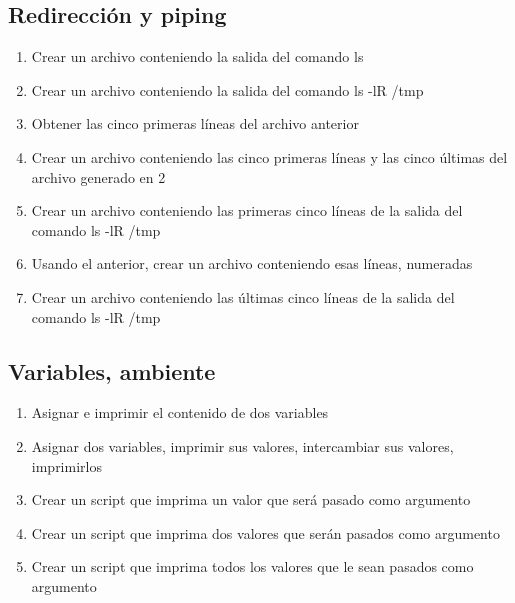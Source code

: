 \subsection{Redirección y piping}
\begin{enumerate}
	\item Crear un archivo conteniendo la salida del comando ls
	\item Crear un archivo conteniendo la salida del comando ls -lR /tmp
	\item Obtener las cinco primeras líneas del archivo anterior
	\item Crear un archivo conteniendo las cinco primeras líneas y las cinco  últimas del archivo generado en 2
	\item Crear un archivo conteniendo las primeras cinco líneas de la salida del comando ls -lR /tmp
	\item Usando el anterior, crear un archivo conteniendo esas líneas, numeradas
	\item Crear un archivo conteniendo las últimas cinco líneas de la salida del comando ls -lR /tmp
\end{enumerate}


\subsection {Variables, ambiente}
\begin{enumerate}
	\item Asignar e imprimir el contenido de dos variables
	\item Asignar dos variables, imprimir sus valores, intercambiar sus valores, imprimirlos
	\item Crear un script que imprima un valor que será pasado como argumento
	\item Crear un script que imprima dos valores que serán pasados como argumento
	\item Crear un script que imprima todos los valores que le sean pasados como argumento
\end{enumerate}


